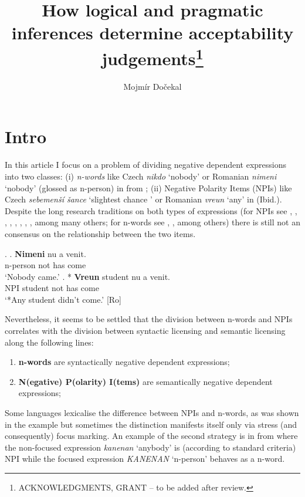 \documentclass[12pt]{scrartcl}
\title{How logical and pragmatic inferences determine acceptability judgements\thanks{ACKNOWLEDGMENTS, GRANT -- to be added after review.}}
\author{Mojmír Dočekal}
\begin{document}
\maketitle

\hypertarget{intro}{%
\section{Intro}\label{intro}}

In this article I focus on a problem of dividing negative dependent expressions into two classes: (i) \textit{n-words} like Czech \textit{nikdo } `nobody' or Romanian \textit{nimeni} `nobody' (glossed as n-person) in \Next[a] from \cite{fualuaus2016fragment}; (ii) Negative Polarity Items (NPIs) like Czech \textit{sebemenší šance} `slightest chance ' or Romanian \textit{vreun} `any' in \Next[b] (Ibid.). Despite the long research traditions on both types of expressions (for NPIs see \citealt{heim1984note}, \citealt{ladusaw1992expressing}, \citealt{kadmon1993any}, \citealt{krifka1995semantics}, \citealt{giannakidou1997landscape}, \citealt{lahiri1998focus}, \citealt{gajewski2011licensing}, \citealt{chierchia2013logic}, \cite{crnivc2014against} among many others; for n-words see \citealt{laka1990negation}, \citealt{zeijlstra2004sentential}, \citealt{zeijlstra2008negative} among others) there is still not an consensus on the relationship between the two items. 

\ex. \ag. \textbf{Nimeni} nu a venit.\\
n-person not has come\\
`Nobody came.' \bg. * \textbf{Vreun} student nu a venit.\\
NPI student not has come\\
`*Any student didn't come.' \hfill [Ro]

Nevertheless, it seems to be settled that the division between n-words and NPIs correlates with the division between syntactic licensing and semantic licensing along the following lines:

\begin{enumerate}
\def\labelenumi{\arabic{enumi})}
\item
  \textbf{n-words} are syntactically negative dependent expressions;
\item \textbf{N(egative) P(olarity) I(tems)} are semantically negative dependent expressions;
\end{enumerate}

Some languages lexicalise the difference between NPIs and n-words, as was shown in the example \Last but sometimes the distinction manifests itself only via stress (and consequently) focus marking. An example of the second strategy is in \Next from \cite{giannakidou2017landscape} where the non-focused expression \textit{kanenan} `anybody' is (according to standard criteria) NPI while the focused expression \textit{KANENAN} `n-person' behaves as a n-word.
\end{document}

